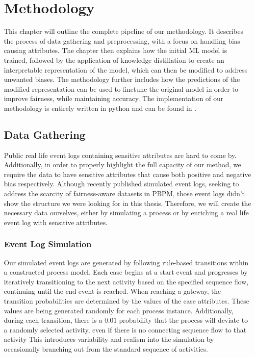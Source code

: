 \chapter{Methodology}
\label{sec:methodology}
This chapter will outline the complete pipeline of our methodology.
It describes the process of data gathering and preprocessing,
with a focus on handling bias causing attributes.
The chapter then explains how the initial ML model is trained,
followed by the application of knowledge distillation to create an interpretable
representation of the model, which can then be modified to address unwanted biases.
The methodology further includes how the predictions of the modified representation
can be used to finetune the original model in order to improve fairness, while maintaining accuracy.
The implementation of our methodology is entirely written in python and can be found in \cite{implementation}.

\section{Data Gathering}
Public real life event logs
containing sensitive attributes are hard to come by.
Additionally, in order to properly highlight the full capacity of our method,
we require the data to have sensitive attributes
that cause both positive and negative bias respectively.
Although \cite{simulated_logs} recently published simulated event logs,
seeking to address the scarcity of fairness-aware datasets in PBPM,
those event logs didn't show the structure we were looking for in this thesis.
Therefore, we will create the necessary data ourselves,
either by simulating a process or by enriching a real life event log with sensitive attributes.

\subsection{Event Log Simulation}
Our simulated event logs are generated by following rule-based transitions within a constructed process model.
Each case begins at a start event and progresses by iteratively transitioning to the next activity
based on the specified sequence flow, continuing until the end event is reached.
When reaching a gateway, the transition probabilities are determined by the values of the case attributes.
These values are being generated randomly for each process instance.
Additionally, during each transition, there is a $0.01$ probability that the process will deviate to a randomly selected activity,
even if there is no connecting sequence flow to that activity
This introduces variability and realism into the simulation by occasionally branching out from the standard sequence of activities.

